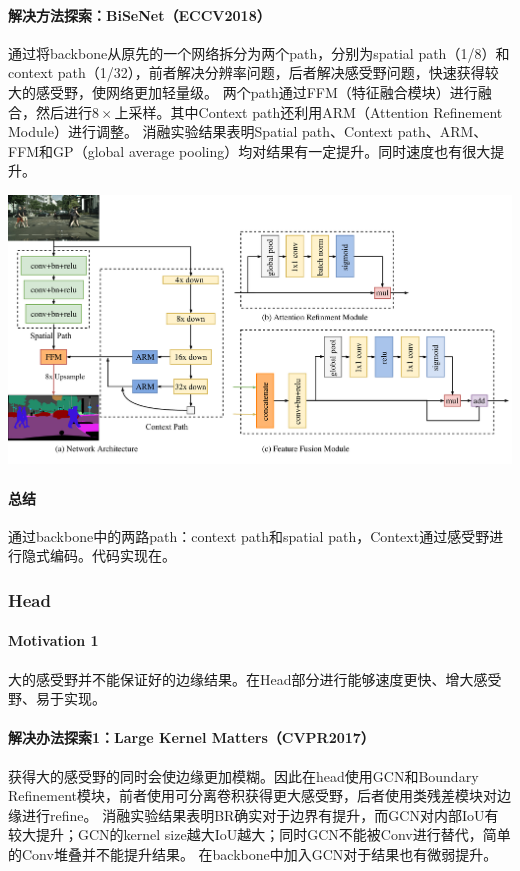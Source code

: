 \documentclass[UTF8, a4paper]{ctexart}
\begin{document}
\paragraph{解决方法探索：BiSeNet（ECCV2018）\cite{BiSeNet}}

通过将backbone从原先的一个网络拆分为两个path，分别为spatial path（1/8）和context path（1/32），前者解决分辨率问题，后者解决感受野问题，快速获得较大的感受野，使网络更加轻量级。
两个path通过FFM（特征融合模块）进行融合，然后进行$8\times$上采样。其中Context path还利用ARM（Attention Refinement Module）进行调整。
消融实验结果表明Spatial path、Context path、ARM、FFM和GP（global average pooling）均对结果有一定提升。同时速度也有很大提升。

{\includegraphics[width=0.95\linewidth]{img/BiSeNet-network}}

\paragraph{总结}
通过backbone中的两路path：context path和spatial path，Context通过感受野进行隐式编码。代码实现在\cite{torchseg_code}。

\subsubsection{Head}

\paragraph{Motivation 1}
大的感受野并不能保证好的边缘结果。在Head部分进行能够速度更快、增大感受野、易于实现。

\paragraph{解决办法探索1：Large Kernel Matters（CVPR2017）\cite{GCN}}
获得大的感受野的同时会使边缘更加模糊。因此在head使用GCN和Boundary Refinement模块，前者使用可分离卷积获得更大感受野，后者使用类残差模块对边缘进行refine。
消融实验结果表明BR确实对于边界有提升，而GCN对内部IoU有较大提升；GCN的kernel size越大IoU越大；同时GCN不能被Conv进行替代，简单的Conv堆叠并不能提升结果。
在backbone中加入GCN对于结果也有微弱提升。
\end{document}
